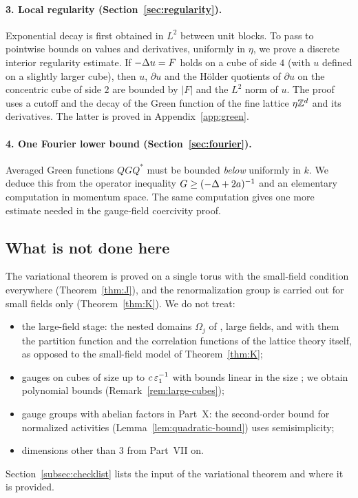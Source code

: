 \paragraph{3. Local regularity (Section~\ref{sec:regularity}).} Exponential decay is first obtained in $L^2$ between unit blocks. To pass to pointwise bounds on values and derivatives, uniformly in $\eta$, we prove a discrete interior regularity estimate. If $-\Delta u=F$ holds on a cube of side $4$ (with $u$ defined on a slightly larger cube), then $u$, $\partial u$ and the H\"older quotients of $\partial u$ on the concentric cube of side $2$ are bounded by $|F|$ and the $L^2$ norm of $u$. The proof uses a cutoff and the decay of the Green function of the fine lattice $\eta\mathbb Z^d$ and its derivatives. The latter is proved in Appendix~\ref{app:green}.

\paragraph{4. One Fourier lower bound (Section~\ref{sec:fourier}).} Averaged Green functions $QGQ^*$ must be bounded \emph{below} uniformly in $k$. We deduce this from the operator inequality $G\ge(-\Delta+2a)^{-1}$ and an elementary computation in momentum space. The same computation gives one more estimate needed in the gauge-field coercivity proof.

\subsection{What is not done here}

The variational theorem is proved on a single torus with the small-field condition everywhere (Theorem~\ref{thm:J}), and the renormalization group is carried out for small fields only (Theorem~\ref{thm:K}). We do not treat:
\begin{itemize}
\item the large-field stage: the nested domains $\Omega_j$ of \cite{BalVar}, large fields, and with them the partition function and the correlation functions of the lattice theory itself, as opposed to the small-field model of Theorem~\ref{thm:K};
\item gauges on cubes of size up to $c\,\varepsilon_1^{-1}$ with bounds linear in the size \cite[(9), (10)]{BalVar}; we obtain polynomial bounds (Remark~\ref{rem:large-cubes});
\item gauge groups with abelian factors in Part~X: the second-order bound for normalized activities (Lemma~\ref{lem:quadratic-bound}) uses semisimplicity;
\item dimensions other than $3$ from Part~VII on.
\end{itemize}
Section~\ref{subsec:checklist} lists the input of the variational theorem and where it is provided.

